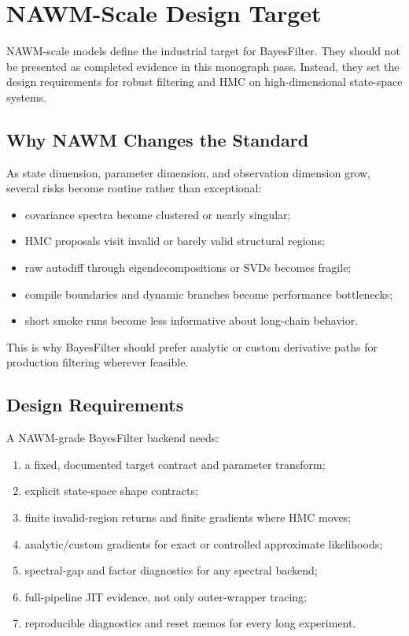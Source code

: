 \chapter{NAWM-Scale Design Target}
\label{ch:bf-nawm-design-target}

NAWM-scale models define the industrial target for BayesFilter.  They should
not be presented as completed evidence in this monograph pass.  Instead, they
set the design requirements for robust filtering and HMC on high-dimensional
state-space systems.

\section{Why NAWM Changes the Standard}
\label{sec:bf-nawm-standard}

As state dimension, parameter dimension, and observation dimension grow, several
risks become routine rather than exceptional:
\begin{itemize}
  \item covariance spectra become clustered or nearly singular;
  \item HMC proposals visit invalid or barely valid structural regions;
  \item raw autodiff through eigendecompositions or SVDs becomes fragile;
  \item compile boundaries and dynamic branches become performance bottlenecks;
  \item short smoke runs become less informative about long-chain behavior.
\end{itemize}
This is why BayesFilter should prefer analytic or custom derivative paths for
production filtering wherever feasible.

\section{Design Requirements}
\label{sec:bf-nawm-requirements}

A NAWM-grade BayesFilter backend needs:
\begin{enumerate}[label=(\roman*)]
  \item a fixed, documented target contract and parameter transform;
  \item explicit state-space shape contracts;
  \item finite invalid-region returns and finite gradients where HMC moves;
  \item analytic/custom gradients for exact or controlled approximate
    likelihoods;
  \item spectral-gap and factor diagnostics for any spectral backend;
  \item full-pipeline JIT evidence, not only outer-wrapper tracing;
  \item reproducible diagnostics and reset memos for every long experiment.
\end{enumerate}

